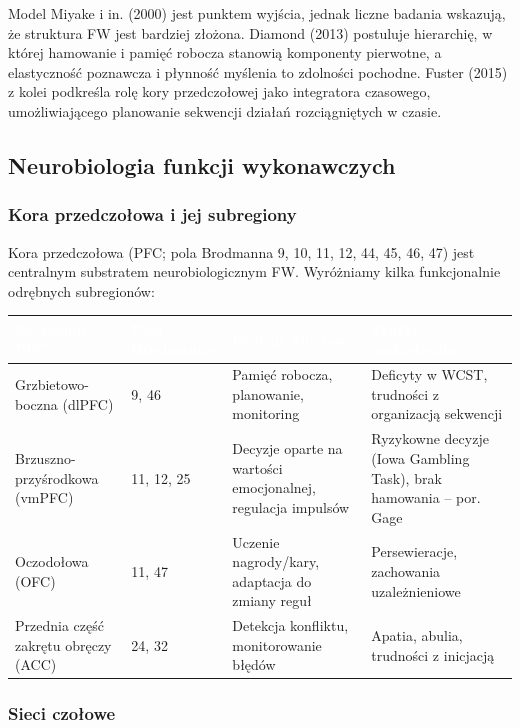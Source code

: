 \documentclass[11pt,a4paper]{article}
\begin{document}
Model Miyake i in. (2000) jest punktem wyjścia, jednak liczne badania wskazują, że struktura FW jest bardziej złożona. Diamond (2013) postuluje hierarchię, w której hamowanie i pamięć robocza stanowią komponenty pierwotne, a elastyczność poznawcza i płynność myślenia to zdolności pochodne. Fuster (2015) z kolei podkreśla rolę kory przedczołowej jako integratora czasowego, umożliwiającego planowanie sekwencji działań rozciągniętych w czasie.

\subsection{Neurobiologia funkcji wykonawczych}

\subsubsection{Kora przedczołowa i jej subregiony}

Kora przedczołowa (PFC; pola Brodmanna 9, 10, 11, 12, 44, 45, 46, 47) jest centralnym substratem neurobiologicznym FW. Wyróżniamy kilka funkcjonalnie odrębnych subregionów:

\begin{table}[htbp]
\centering
\small
\begin{tabularx}{\textwidth}{p{3.3cm} p{2.2cm} X X}
\toprule
\rowcolor{headerblue}
\textcolor{white}{\textbf{Subregion PFC}} & \textcolor{white}{\textbf{Pola Brodmanna}} & \textcolor{white}{\textbf{Funkcje kluczowe}} & \textcolor{white}{\textbf{Skutki uszkodzenia}} \\
\midrule
Grzbietowo-boczna (dlPFC) & 9, 46 & Pamięć robocza, planowanie, monitoring & Deficyty w WCST, trudności z organizacją sekwencji \\
\rowcolor{rowblue}
Brzuszno-przyśrodkowa (vmPFC) & 11, 12, 25 & Decyzje oparte na wartości emocjonalnej, regulacja impulsów & Ryzykowne decyzje (Iowa Gambling Task), brak hamowania -- por. Gage \\
Oczodołowa (OFC) & 11, 47 & Uczenie nagrody/kary, adaptacja do zmiany reguł & Persewieracje, zachowania uzależnieniowe \\
\rowcolor{rowblue}
Przednia część zakrętu obręczy (ACC) & 24, 32 & Detekcja konfliktu, monitorowanie błędów & Apatia, abulia, trudności z inicjacją \\
\bottomrule
\end{tabularx}
\end{table}

\subsubsection{Sieci czołowe}
\end{document}
